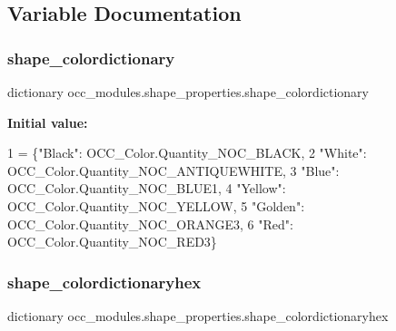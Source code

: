 \subsection{Variable Documentation}
\hypertarget{a00056_a2435b9798b2353ff84c79fe909cc39fd}{}\label{a00056_a2435b9798b2353ff84c79fe909cc39fd} 
\subsubsection{\texorpdfstring{shape\+\_\+colordictionary}{shape\_colordictionary}}
{\footnotesize\ttfamily dictionary occ\+\_\+modules.\+shape\+\_\+properties.\+shape\+\_\+colordictionary}

{\bfseries Initial value\+:}
\begin{DoxyCode}
1 =  \{\textcolor{stringliteral}{"Black"}: OCC\_Color.Quantity\_NOC\_BLACK,
2                          \textcolor{stringliteral}{"White"}: OCC\_Color.Quantity\_NOC\_ANTIQUEWHITE,
3                          \textcolor{stringliteral}{"Blue"}: OCC\_Color.Quantity\_NOC\_BLUE1,
4                          \textcolor{stringliteral}{"Yellow"}: OCC\_Color.Quantity\_NOC\_YELLOW,
5                          \textcolor{stringliteral}{"Golden"}: OCC\_Color.Quantity\_NOC\_ORANGE3,
6                          \textcolor{stringliteral}{"Red"}: OCC\_Color.Quantity\_NOC\_RED3\}
\end{DoxyCode}
\hypertarget{a00056_a8deb972f03c3f2b89ddc04b0006dd0b2}{}\label{a00056_a8deb972f03c3f2b89ddc04b0006dd0b2} 
\subsubsection{\texorpdfstring{shape\+\_\+colordictionaryhex}{shape\_colordictionaryhex}}
{\footnotesize\ttfamily dictionary occ\+\_\+modules.\+shape\+\_\+properties.\+shape\+\_\+colordictionaryhex}

